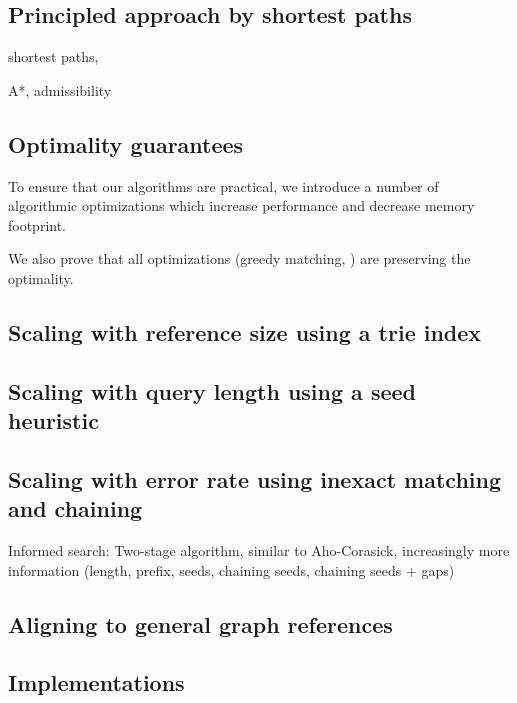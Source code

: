 \subsection*{Principled approach by shortest paths}
shortest paths,

A*, admissibility

\subsection*{Optimality guarantees}
To ensure that our algorithms are practical, we introduce a number of
algorithmic optimizations which increase performance and decrease memory
footprint.

We also prove that all optimizations (greedy matching, ) are preserving the optimality.

\subsection*{Scaling with reference size using a trie index}




\subsection*{Scaling with query length using a seed heuristic}

\subsection*{Scaling with error rate using inexact matching and chaining}

Informed search: Two-stage algorithm, similar to Aho-Corasick, increasingly more information (length, prefix, seeds, chaining seeds, chaining seeds + gaps)

\subsection*{Aligning to general graph references}

\subsection*{Implementations}


